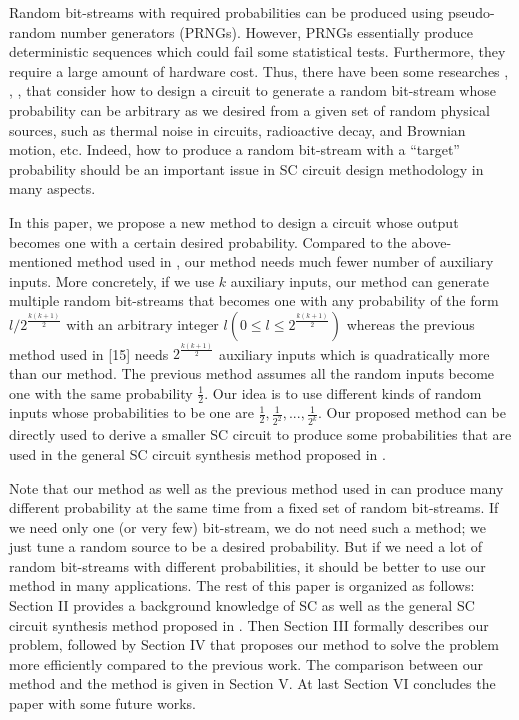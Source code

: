 \documentclass[10pt,conference]{IEEEtran}
\begin{document}
\par
Random bit-streams with required probabilities can be
produced using pseudo-random number generators (PRNGs).
However, PRNGs essentially produce deterministic sequences
which could fail some statistical tests. Furthermore, they
require a large amount of hardware cost. Thus, there have
been some researches \cite{three}, \cite{ten}, \cite{twelve}, \cite{thirteen} that consider how
to design a circuit to generate a random bit-stream whose
probability can be arbitrary as we desired from a given set
of random physical sources, such as thermal noise in circuits,
radioactive decay, and Brownian motion, etc. Indeed, how to
produce a random bit-stream with a “target” probability should
be an important issue in SC circuit design methodology in
many aspects.
\par
In this paper, we propose a new method to design a circuit
whose output becomes one with a certain desired probability.
Compared to the above-mentioned method used in \cite{fifteen}, our
method needs much fewer number of auxiliary inputs. More
concretely, if we use $k$ auxiliary inputs, our method can
generate multiple random bit-streams that becomes one with
any probability of the form $l/2^{\frac{k(k+1)}{2}}$
with an arbitrary integer
$l (0\leq l\leq2^{\frac{k(k+1)}{2}})$ whereas the previous method used in [15]
needs $2^{\frac{k(k+1)}{2}}$ auxiliary inputs which is quadratically more
than our method. The previous method assumes all the random
inputs become one with the same probability $\frac{1}
{2}$. Our idea is 
to use different kinds of random inputs whose probabilities
to be one are $\frac{1}{2},\frac{1}{2^{2}},...,\frac{1}{2^{k}}$. Our proposed method can be
directly used to derive a smaller SC circuit to produce some
probabilities that are used in the general SC circuit synthesis
method proposed in \cite{fifteen}.
\par
Note that our method as well as the previous method used
in \cite{fifteen} can produce many different probability at the same time
from a fixed set of random bit-streams. If we need only one
(or very few) bit-stream, we do not need such a method; we
just tune a random source to be a desired probability. But if we
need a lot of random bit-streams with different probabilities,
it should be better to use our method in many applications.
The rest of this paper is organized as follows: Section II
provides a background knowledge of SC as well as the general
SC circuit synthesis method proposed in \cite{fifteen}. Then Section III
formally describes our problem, followed by Section IV that
proposes our method to solve the problem more efficiently
compared to the previous work. The comparison between our
method and the method \cite{fifteen} is given in Section V. At last
Section VI concludes the paper with some future works.
\end{document}
